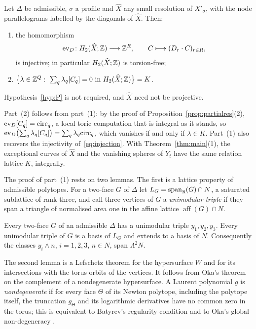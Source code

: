 \begin{proposition}\label{prop:integral}
Let $\Delta$ be admissible, $\sigma$ a profile and $\widehat X$ any small resolution of $X'_\sigma$, with the node
parallelograms labelled by the diagonals of $\widehat X$. Then:
\begin{enumerate}
\item the homomorphism
\begin{equation}\label{eq:iotaZ}
\mathrm{ev}_D\colon H_2(\widehat X;\mathbb Z)\longrightarrow\mathbb Z^R,\qquad C\longmapsto(D_r\cdot C)_{r\in R},
\end{equation}
is injective; in particular $H_2(\widehat X;\mathbb Z)$ is torsion-free;
\item $\bigl\{\lambda\in\Z^Q:\ \sum_q\lambda_q[C_q]=0\text{ in }H_2(\widehat X;\Z)\bigr\}=K$.
\end{enumerate}
Hypothesis~\ref{hyp:P} is not required, and $\widehat X$ need not be projective.
\end{proposition}

Part~(2) follows from part~(1): by the proof of Proposition~\ref{prop:partialres}(2), $\mathrm{ev}_D[C_q]=\mathrm{circ}_q$, a local toric
computation that is integral as it stands, so $\mathrm{ev}_D\bigl(\sum_q\lambda_q[C_q]\bigr)=\sum_q\lambda_q\mathrm{circ}_q$, which
vanishes if and only if $\lambda\in K$. Part~(1) also recovers the injectivity of~\eqref{eq:injection}. With
Theorem~\ref{thm:main}(1), the exceptional curves of $\widehat X$ and the vanishing spheres of $Y_t$ have the same
relation lattice $K$, integrally.

The proof of part~(1) rests on two lemmas. The first is a lattice property of admissible polytopes. For a two-face $G$
of $\Delta$ let $L_G=\operatorname{span}_\mathbb R(G)\cap N$, a saturated sublattice of rank three, and call three vertices of
$G$ a \emph{unimodular triple} if they span a triangle of normalised area one in the affine lattice
$\operatorname{aff}(G)\cap N$.

\begin{lemma}\label{lem:triple}
Every two-face $G$ of an admissible $\Delta$ has a unimodular triple $y_1,y_2,y_3$. Every unimodular triple of $G$ is a
basis of $L_G$ and extends to a basis of $N$. Consequently the classes $y_i\wedge n$, $i=1,2,3$, $n\in N$, span
$\Lambda^2N$.
\end{lemma}

The second lemma is a Lefschetz theorem for the hypersurface $W$ and for its intersections with the torus orbits of
the vertices. It follows from Oka's theorem on the complement of a nondegenerate hypersurface. A Laurent polynomial $g$
is \emph{nondegenerate} if for every face $\Theta$ of its Newton polytope, including the polytope itself, the
truncation $g_\Theta$ and its logarithmic derivatives have no common zero in the torus; this is equivalent to Batyrev's
regularity condition \cite[\S3]{Batyrev} and to Oka's global non-degeneracy \cite[Def.~(5.1)]{Oka80}.

